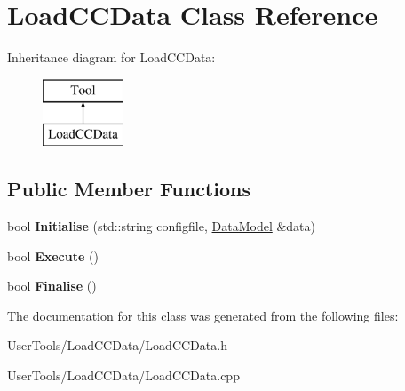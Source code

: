 \hypertarget{classLoadCCData}{\section{Load\-C\-C\-Data Class Reference}
\label{classLoadCCData}
}
Inheritance diagram for Load\-C\-C\-Data\-:\begin{figure}[H]
\begin{center}
\leavevmode
\includegraphics[height=2.000000cm]{classLoadCCData}
\end{center}
\end{figure}
\subsection*{Public Member Functions}
\begin{DoxyCompactItemize}
\item 
\hypertarget{classLoadCCData_ad27ea87d892f247f70f8b96ca67329b1}{bool {\bfseries Initialise} (std\-::string configfile, \hyperlink{classDataModel}{Data\-Model} \&data)}\label{classLoadCCData_ad27ea87d892f247f70f8b96ca67329b1}

\item 
\hypertarget{classLoadCCData_a102f586b9ad192e73b037c764dfd22e0}{bool {\bfseries Execute} ()}\label{classLoadCCData_a102f586b9ad192e73b037c764dfd22e0}

\item 
\hypertarget{classLoadCCData_adab5adee6f15c924a7077d63227e623c}{bool {\bfseries Finalise} ()}\label{classLoadCCData_adab5adee6f15c924a7077d63227e623c}

\end{DoxyCompactItemize}


The documentation for this class was generated from the following files\-:\begin{DoxyCompactItemize}
\item 
User\-Tools/\-Load\-C\-C\-Data/Load\-C\-C\-Data.\-h\item 
User\-Tools/\-Load\-C\-C\-Data/Load\-C\-C\-Data.\-cpp\end{DoxyCompactItemize}
